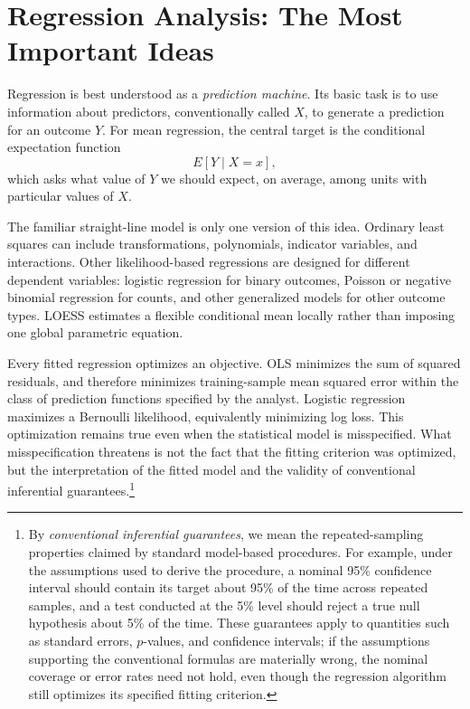 \documentclass[11pt]{report}
\begin{document}
\chapter{Regression Analysis: The Most Important Ideas}
\label{chap:summary}

Regression is best understood as a \emph{prediction machine}. Its basic task is to use information about predictors, conventionally called \(X\), to generate a prediction for an outcome \(Y\). For mean regression, the central target is the conditional expectation function
\[
E[Y\mid X=x],
\]
which asks what value of \(Y\) we should expect, on average, among units with particular values of \(X\).

The familiar straight-line model is only one version of this idea. Ordinary least squares can include transformations, polynomials, indicator variables, and interactions. Other likelihood-based regressions are designed for different dependent variables: logistic regression for binary outcomes, Poisson or negative binomial regression for counts, and other generalized models for other outcome types. LOESS estimates a flexible conditional mean locally rather than imposing one global parametric equation.

Every fitted regression optimizes an objective. OLS minimizes the sum of squared residuals, and therefore minimizes training-sample mean squared error within the class of prediction functions specified by the analyst. Logistic regression maximizes a Bernoulli likelihood, equivalently minimizing log loss. This optimization remains true even when the statistical model is misspecified. What misspecification threatens is not the fact that the fitting criterion was optimized, but the interpretation of the fitted model and the validity of conventional inferential guarantees.\footnote{By \emph{conventional inferential guarantees}, we mean the repeated-sampling properties claimed by standard model-based procedures. For example, under the assumptions used to derive the procedure, a nominal 95\% confidence interval should contain its target about 95\% of the time across repeated samples, and a test conducted at the 5\% level should reject a true null hypothesis about 5\% of the time. These guarantees apply to quantities such as standard errors, \(p\)-values, and confidence intervals; if the assumptions supporting the conventional formulas are materially wrong, the nominal coverage or error rates need not hold, even though the regression algorithm still optimizes its specified fitting criterion.}
\end{document}
